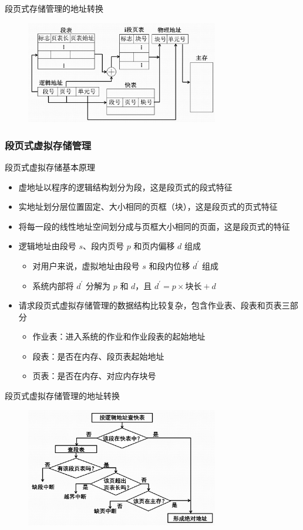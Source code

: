 \documentclass[cs4size,a4paper,10pt]{ctexart}
\begin{document}
		段页式存储管理的地址转换
		\begin{figure}[H]
			\centering
			\includegraphics[width=0.75\textwidth]{img/3.4.3.1.2}
		\end{figure}

		\subsubsection{段页式虚拟存储管理}
		段页式虚拟存储基本原理
		\begin{itemize}
			\item 虚地址以程序的逻辑结构划分为段，这是段页式的段式特征
			\item 实地址划分层位置固定、大小相同的页框（块），这是段页式的页式特征
			\item 将每一段的线性地址空间划分成与页框大小相同的页面，这是段页式的特征
			\item 逻辑地址由段号 $s$、段内页号 $p$ 和页内偏移 $d$ 组成
			\begin{itemize}
				\item 对用户来说，虚拟地址由段号 $s$ 和段内位移 $d^\prime$ 组成
				\item 系统内部将 $d^\prime$ 分解为 $p$ 和 $d$，且 $d^\prime = p \times \mbox{块长} + d$
			\end{itemize}
			\item 请求段页式虚拟存储管理的数据结构比较复杂，包含作业表、段表和页表三部分
			\begin{itemize}
				\item 作业表：进入系统的作业和作业段表的起始地址
				\item 段表：是否在内存、段页表起始地址
				\item 页表：是否在内存、对应内存块号
			\end{itemize}
		\end{itemize}

		段页式虚拟存储管理的地址转换
		\begin{figure}[H]
			\centering
			\includegraphics[width=0.75\textwidth]{img/3.4.3.2}
		\end{figure}
\end{document}
